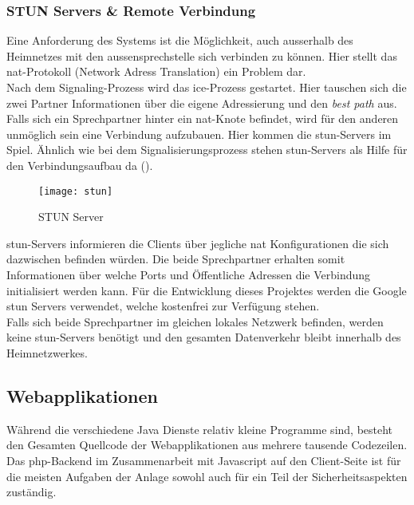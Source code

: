 \subsubsection{STUN Servers \& Remote Verbindung}
\label{test}
Eine Anforderung des Systems ist die Möglichkeit, auch ausserhalb des Heimnetzes mit den \gls{aussensprechstelle} sich verbinden zu können. Hier stellt das \gls{nat}-Protokoll (Network Adress Translation) ein Problem dar.
\\
Nach dem Signaling-Prozess wird das \gls{ice}-Prozess gestartet. Hier tauschen sich die zwei Partner Informationen über die eigene Adressierung und den \textit{best path} aus. Falls sich ein Sprechpartner hinter ein \gls{nat}-Knote befindet, wird für den anderen unmöglich sein eine Verbindung aufzubauen. Hier kommen die \gls{stun}-Servers im Spiel. Ähnlich wie bei dem Signalisierungsprozess stehen \gls{stun}-Servers als Hilfe für den Verbindungsaufbau da ().
\begin{figure}[htb!]
	\begin{center}
		\texttt{[image: stun]}
		\caption[STUN Server]{STUN Server}
		\label{fig:stun}
	\end{center}
\end{figure}
\gls{stun}-Servers informieren die Clients über jegliche \gls{nat} Konfigurationen die sich dazwischen befinden würden. Die beide Sprechpartner erhalten somit Informationen über welche Ports und Öffentliche Adressen die Verbindung initialisiert werden kann. Für die Entwicklung dieses Projektes werden die Google \gls{stun} Servers verwendet, welche kostenfrei zur Verfügung stehen.
\\
Falls sich beide Sprechpartner im gleichen lokales Netzwerk befinden, werden keine \gls{stun}-Servers benötigt und den gesamten Datenverkehr bleibt innerhalb des Heimnetzwerkes.

\subsection{Webapplikationen}
\label{kap:webapp}
Während die verschiedene Java Dienste relativ kleine Programme sind, besteht den Gesamten Quellcode der Webapplikationen aus mehrere tausende Codezeilen.
\\
Das \gls{php}-Backend im Zusammenarbeit mit Javascript auf den Client-Seite ist für die meisten Aufgaben der Anlage sowohl auch für ein Teil der Sicherheitsaspekten zuständig.

